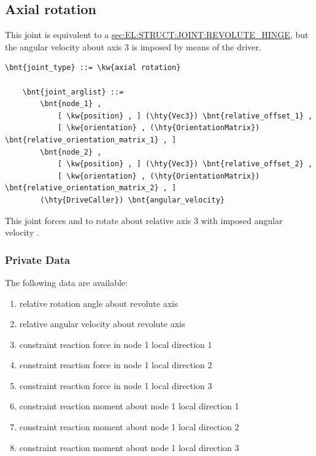 \subsection{Axial rotation}
\label{sec:EL:STRUCT:JOINT:AXIAL_ROTATION}
This joint is equivalent to a
\hyperref{\kw{revolute hinge}}{\kw{revolute hinge} (see Section~}{)}{sec:EL:STRUCT:JOINT:REVOLUTE_HINGE},
but the angular velocity about axis 3 is imposed by means of the driver.
\begin{Verbatim}[commandchars=\\\{\}]
    \bnt{joint_type} ::= \kw{axial rotation}

    \bnt{joint_arglist} ::= 
        \bnt{node_1} ,
            [ \kw{position} , ] (\hty{Vec3}) \bnt{relative_offset_1} ,
            [ \kw{orientation} , (\hty{OrientationMatrix}) \bnt{relative_orientation_matrix_1} , ]
        \bnt{node_2} ,
            [ \kw{position} , ] (\hty{Vec3}) \bnt{relative_offset_2} ,
            [ \kw{orientation} , (\hty{OrientationMatrix}) \bnt{relative_orientation_matrix_2} , ]
        (\hty{DriveCaller}) \bnt{angular_velocity}
\end{Verbatim}
This joint forces  and  to rotate about relative 
axis 3 with imposed angular velocity .

\subsubsection{Private Data}
The following data are available:
\begin{enumerate}
\item {} relative rotation angle about revolute axis
\item {} relative angular velocity about revolute axis
\item {} constraint reaction force in node 1 local direction 1
\item {} constraint reaction force in node 1 local direction 2
\item {} constraint reaction force in node 1 local direction 3
\item {} constraint reaction moment about node 1 local direction 1
\item {} constraint reaction moment about node 1 local direction 2
\item {} constraint reaction moment about node 1 local direction 3
\end{enumerate}

